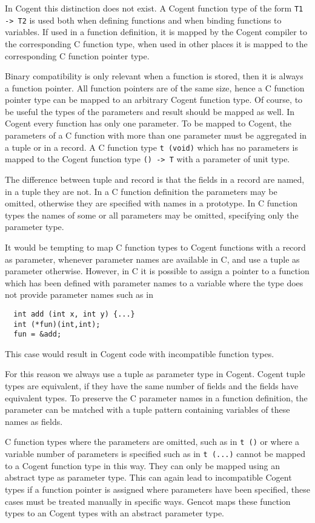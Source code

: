 \documentclass[a4paper]{report}
\newcommand{\code}[1]{\textnormal{\texttt{#1}}}
\begin{document}
In Cogent this distinction does not exist. A Cogent function type of the form \code{T1 -> T2} is used both when
defining functions and when binding functions to variables. If used in a function definition, it is mapped by
the Cogent compiler to the corresponding C function type, when used in other places it is mapped to the 
corresponding C function pointer type.

Binary compatibility is only relevant when a function is stored, then it is always a function pointer. All function
pointers are of the same size, hence a C function pointer type can be mapped to an arbitrary Cogent function type.
Of course, to be useful the types of the parameters and result should be mapped as well. In Cogent every function
has only one parameter. To be mapped to Cogent, the parameters of a C function with more than one parameter must
be aggregated in a tuple or in a record. A C function type \code{t (void)} which has no parameters is mapped
to the Cogent function type \code{() -> T} with a parameter of unit type.

The difference between tuple and record is that the fields in a record are named, in a tuple they are not. In 
a C function definition the parameters may be omitted, otherwise they are specified with names in a prototype.
In C function types the names of some or all parameters may be omitted, specifying only the parameter type.

It would be tempting to map C function types to Cogent functions with a record as parameter, whenever parameter 
names are available in C, and use a tuple as parameter otherwise. However, in C it is possible to assign a 
pointer to a function which has been defined 
with parameter names to a variable where the type does not provide parameter names such as in 
\begin{verbatim}
  int add (int x, int y) {...}
  int (*fun)(int,int);
  fun = &add;
\end{verbatim}
This case would result in Cogent code with incompatible function types.

For this reason we always use a tuple as parameter type in Cogent. Cogent tuple types are equivalent, if they
have the same number of fields and the fields have equivalent types. To preserve the C parameter names in 
a function definition, the parameter can be matched with a tuple pattern containing variables of these
names as fields.

C function types where the parameters are omitted, such as in \code{t ()} or where a variable number of
parameters is specified such as in \code{t (...)} cannot be mapped to a Cogent function type in this way. 
They can only be mapped using an abstract type as parameter type. This can again lead to incompatible 
Cogent types if a function pointer is assigned where parameters have been specified, these cases must 
be treated manually in specific ways. Gencot maps these function types to an Cogent types with an abstract
parameter type.
\end{document}
